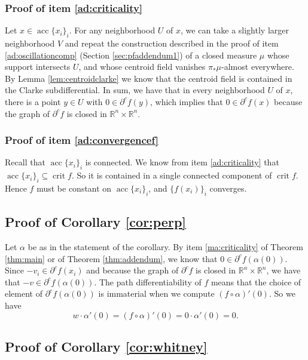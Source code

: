 \documentclass[11pt]{article}
\theoremstyle{definition}
\theoremstyle{remark}
\DeclareMathOperator{\crit}{crit}
\DeclareMathOperator{\acc}{acc}
\newcommand{\R}{\mathbb{R}}
\begin{document}
\subsubsection{Proof of item \ref{ad:criticality}}
\label{sec:pfaddendum2}

Let $x\in\acc\{x_i\}_i$.
For any neighborhood $U$ of $x$, we can take a slightly larger neighborhood $V$ and repeat the construction described in the proof of item \ref{ad:oscillationcomp} (Section \ref{sec:pfaddendum1}) of a closed measure $\mu$ whose support intersects $U$, and whose centroid field vanishes $\pi_*\mu$-almost everywhere. By Lemma \ref{lem:centroidclarke} we know that the centroid field is contained in the Clarke subdifferential. In sum, we have that in every neighborhood $U$ of $x$, there is a point $y\in U$ with $0\in \partial^c f(y)$, which implies that $0\in \partial^cf(x)$ because the graph of $\partial^cf$ is closed in $\R^n\times\R^n$.

\subsubsection{Proof of item \ref{ad:convergencef}}
\label{sec:pfaddendum3}

Recall that  $\acc\{x_i\}_i$ is connected. %
We know from item \ref{ad:criticality} that $\acc\{x_i\}_i\subseteq\crit f$.
So it is contained in a single connected component of $\crit f$. Hence $f$ must be constant on $\acc\{x_i\}_i$, and $\{f(x_i)\}_i$ converges.


 
\subsection{Proof of Corollary \ref{cor:perp}}
\label{sec:pfcorperp}

Let $\alpha$ be as in the statement of the corollary. By item \ref{ma:criticality} of Theorem \ref{thm:main} or of Theorem \ref{thm:addendum}, we know that $0\in\partial^cf(\alpha(0))$. Since $-v_i\in \partial^cf(x_i)$ and because the graph of $\partial^cf$ is closed in $\R^n\times\R^n$, we have that $-v\in\partial^cf(\alpha(0))$. The path differentiability of $f$ means that the choice of element of $\partial^cf(\alpha(0))$ is immaterial when we compute $(f\circ\alpha)'(0)$. %
So we have
\[w\cdot\alpha'(0)=(f\circ\alpha)'(0)=0\cdot\alpha'(0)=0.\]

\subsection{Proof of Corollary \ref{cor:whitney}}
\label{sec:pfcorwhitney}
 
\end{document}
